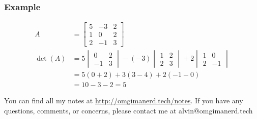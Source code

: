 \documentclass{math}
\begin{document}
\subsubsection*{Example}
\begin{align*}
  A &= \begin{bmatrix}
    5 & -3 & 2 \\
    1 & 0 & 2 \\
    2 & -1 & 3
  \end{bmatrix} \\
  \det(A) &= 5\begin{vmatrix}
    0 & 2 \\
    -1 & 3
  \end{vmatrix}-(-3)\begin{vmatrix}
    1 & 2 \\
    2 & 3
  \end{vmatrix}+2\begin{vmatrix}
    1 & 0 \\
    2 & -1
  \end{vmatrix} \\
  &= 5(0+2)+3(3-4)+2(-1-0) \\
  &= 10-3-2 = 5
\end{align*}

\begin{center}
  You can find all my notes at \url{http://omgimanerd.tech/notes}. If you have
  any questions, comments, or concerns, please contact me at
  alvin@omgimanerd.tech
\end{center}
\end{document}
